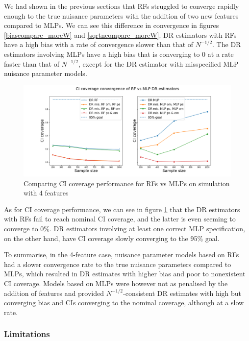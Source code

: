 \documentclass[12pt,twoside]{article}
\begin{document}
We had shown in the previous sections that RFs struggled to converge rapidly enough to the true nuisance parameters with the addition of two new features compared to MLPs. We can see this difference in convergence in figures \ref{biascompare_moreW} and \ref{sqrtncompare_moreW}. DR estimators with RFs have a high bias with a rate of convergence slower than that of $N^{-1/2}$. The DR estimators involving MLPs have a high bias that is converging to 0 at a rate faster than that of $N^{-1/2}$, except for the DR estimator with misspecified MLP nuisance parameter models.

\begin{figure}[h!]
    \centering
    \includegraphics[width = 0.9\columnwidth]{figures/CIcompare_moreW.png}
    \caption{Comparing CI coverage performance for RFs vs MLPs on simulation with 4 features}
    \label{CIcompare_moreW}
\end{figure}

As for CI coverage performance, we can see in figure \ref{CIcompare_moreW} that the DR estimators with RFs fail to reach nominal CI coverage, and the latter is even seeming to converge to 0\%. DR estimators involving at least one correct MLP specification, on the other hand, have CI coverage slowly converging to the 95\% goal.

To summarise, in the 4-feature case, nuisance parameter models based on RFs had a slower convergence rate to the true nuisance parameters compared to MLPs, which resulted in DR estimates with higher bias and poor to nonexistent CI coverage. Models based on MLPs were however not as penalised by the addition of features and provided $N^{-1/2}$-consistent DR estimates with high but converging bias and CIs converging to the nominal coverage, although at a slow rate.

\subsubsection{Limitations}
\end{document}
